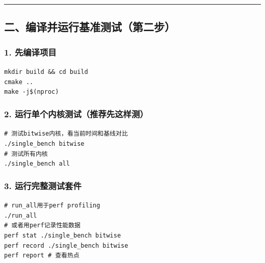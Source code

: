 \documentclass[11pt, a4paper]{article}
\begin{document}
\begin{aibox}
\begin{center}\rule{\textwidth}{0.4pt}\end{center}

\subsection*{二、编译并运行基准测试（第二步）}

\subsubsection*{1. 先编译项目}
\begin{tcolorbox}[colback=white,colframe=gray!50!white,boxrule=0.5pt,arc=2pt,left=5pt,right=5pt,top=5pt,bottom=5pt]
\texttt{mkdir build \&\& cd build}\\
\texttt{cmake ..}\\
\texttt{make -j\$(nproc)}
\end{tcolorbox}

\subsubsection*{2. 运行单个内核测试（推荐先这样测）}
\begin{tcolorbox}[colback=white,colframe=gray!50!white,boxrule=0.5pt,arc=2pt,left=5pt,right=5pt,top=5pt,bottom=5pt]
\texttt{\# 测试bitwise内核，看当前时间和基线对比}\\
\texttt{./single\_bench bitwise}\\[0.5em]
\texttt{\# 测试所有内核}\\
\texttt{./single\_bench all}
\end{tcolorbox}

\subsubsection*{3. 运行完整测试套件}
\begin{tcolorbox}[colback=white,colframe=gray!50!white,boxrule=0.5pt,arc=2pt,left=5pt,right=5pt,top=5pt,bottom=5pt]
\texttt{\# run\_all用于perf profiling}\\
\texttt{./run\_all}\\[0.5em]
\texttt{\# 或者用perf记录性能数据}\\
\texttt{perf stat ./single\_bench bitwise}\\
\texttt{perf record ./single\_bench bitwise}\\
\texttt{perf report  \# 查看热点}
\end{tcolorbox}


\end{aibox}
\end{document}
